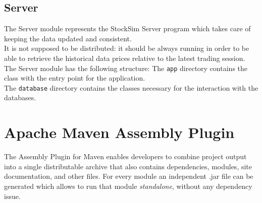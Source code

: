 \subsection{Server}
The Server module represents the StockSim Server program which takes care of
keeping the data updated and consistent.\\
It is not supposed to be distributed: it should be always running in order to be
able to retrieve the historical data prices relative to the latest trading
session.\\
The Server module has the following structure:
\vspace{0.2cm}
\hfill \break
\noindent The \texttt{app} directory contains the class with the entry point for the application.\\
The \texttt{database} directory contains the classes necessary for the interaction with the databases.
\section{Apache Maven Assembly Plugin}
The Assembly Plugin for Maven enables developers to combine project output into 
a single distributable archive that also contains dependencies, modules, site 
documentation, and other files.
For every module an independent .jar file can be generated  which allows to run that module \textit{standalone}, without any dependency issue.
